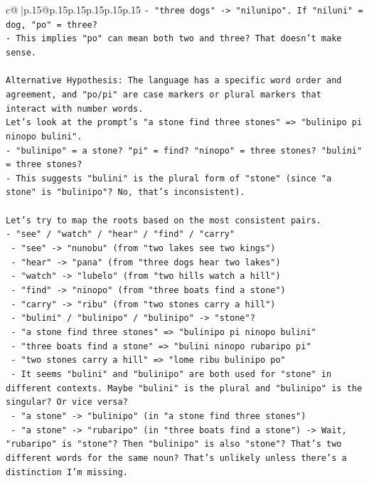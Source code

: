 \documentclass{article}
\begin{document}
{\begin{supertabular}{c@{$\;$}|p{.15\linewidth}@{}p{.15\linewidth}p{.15\linewidth}p{.15\linewidth}p{.15\linewidth}p{.15\linewidth}}
{{{\texttt{{-} "three dogs" {-}> "nilunipo". If "niluni" = dog, "po" = three?} \\
\texttt{{-} This implies "po" can mean both two and three? That doesn't make sense.} \\
\\ 
\texttt{Alternative Hypothesis: The language has a specific word order and agreement, and "po/pi" are case markers or plural markers that interact with number words.} \\
\texttt{Let's look at the prompt's "a stone find three stones" => "bulinipo pi ninopo bulini".} \\
\texttt{{-} "bulinipo" = a stone? "pi" = find? "ninopo" = three stones? "bulini" = three stones?} \\
\texttt{{-} This suggests "bulini" is the plural form of "stone" (since "a stone" is "bulinipo"? No, that's inconsistent).} \\
\\ 
\texttt{Let's try to map the roots based on the most consistent pairs.} \\
\texttt{{-} "see" / "watch" / "hear" / "find" / "carry"} \\
\texttt{  {-} "see" {-}> "nunobu" (from "two lakes see two kings")} \\
\texttt{  {-} "hear" {-}> "pana" (from "three dogs hear two lakes")} \\
\texttt{  {-} "watch" {-}> "lubelo" (from "two hills watch a hill")} \\
\texttt{  {-} "find" {-}> "ninopo" (from "three boats find a stone")} \\
\texttt{  {-} "carry" {-}> "ribu" (from "two stones carry a hill")} \\
\texttt{  {-} "bulini" / "bulinipo" / "bulinipo" {-}> "stone"?} \\
\texttt{    {-} "a stone find three stones" => "bulinipo pi ninopo bulini"} \\
\texttt{    {-} "three boats find a stone" => "bulini ninopo rubaripo pi"} \\
\texttt{    {-} "two stones carry a hill" => "lome ribu bulinipo po"} \\
\texttt{    {-} It seems "bulini" and "bulinipo" are both used for "stone" in different contexts. Maybe "bulini" is the plural and "bulinipo" is the singular? Or vice versa?} \\
\texttt{    {-} "a stone" {-}> "bulinipo" (in "a stone find three stones")} \\
\texttt{    {-} "a stone" {-}> "rubaripo" (in "three boats find a stone") {-}> Wait, "rubaripo" is "stone"? Then "bulinipo" is also "stone"? That's two different words for the same noun? That's unlikely unless there's a distinction I'm missing.} \\
}}}
\end{supertabular}}
\end{document}
